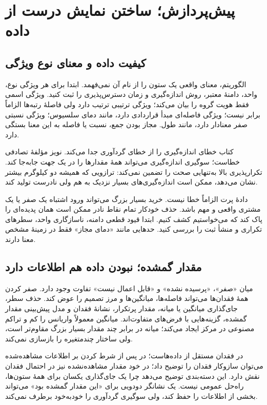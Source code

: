 \chapter{پیش‌پردازش؛ ساختن نمایش درست از داده}

\section{کیفیت داده و معنای نوع ویژگی}
الگوریتم، معنای واقعی یک ستون را از نام آن نمی‌فهمد. ابتدا برای هر ویژگی نوع، واحد، دامنهٔ معتبر، روش اندازه‌گیری و زمان دسترس‌پذیری را ثبت کنید. ویژگی اسمی  فقط هویت گروه را بیان می‌کند؛ ویژگی ترتیبی  ترتیب دارد ولی فاصلهٔ رتبه‌ها الزاماً برابر نیست؛ ویژگی فاصله‌ای مبدأ قراردادی دارد، مانند دمای سلسیوس؛ ویژگی نسبتی صفر معنادار دارد، مانند طول. مجاز بودن جمع، نسبت یا فاصله به این معنا بستگی دارد.

کتاب خطای اندازه‌گیری را از خطای گردآوری جدا می‌کند. نویز مؤلفهٔ تصادفی خطاست؛ سوگیری اندازه‌گیری می‌تواند همهٔ مقدارها را در یک جهت جابه‌جا کند. تکرارپذیری بالا به‌تنهایی صحت را تضمین نمی‌کند: ترازویی که همیشه دو کیلوگرم بیشتر نشان می‌دهد، ممکن است اندازه‌گیری‌های بسیار نزدیک به هم ولی نادرست تولید کند.

دادهٔ پرت  الزاماً خطا نیست. خرید بسیار بزرگ می‌تواند ورود اشتباه یک صفر یا یک مشتری واقعی و مهم باشد. حذف خودکار تمام نقاط نادر ممکن است همان پدیده‌ای را پاک کند که می‌خواستیم کشف کنیم. ابتدا قیود قطعی دامنه، ناسازگاری واحد، سطرهای تکراری و منشأ ثبت را بررسی کنید. حدهایی مانند «دمای مجاز» فقط در زمینهٔ مشخص معنا دارند.

\section{مقدار گمشده؛ نبودن داده هم اطلاعات دارد}
میان «صفر»، «پرسیده نشده» و «قابل اعمال نیست» تفاوت وجود دارد. صفر کردن همهٔ فقدان‌ها می‌تواند فاصله‌ها، میانگین‌ها و مرز تصمیم را عوض کند. حذف سطر، جای‌گذاری میانگین یا میانه، مقدار پرتکرار، نشانهٔ فقدان و مدل پیش‌بینی مقدار گمشده، گزینه‌هایی با فرض‌های متفاوت‌اند. میانگین معمولاً واریانس را کم و تراکم مصنوعی در مرکز ایجاد می‌کند؛ میانه در برابر چند مقدار بسیار بزرگ مقاوم‌تر است، ولی ساختار چندمتغیره را بازسازی نمی‌کند.

در  فقدان مستقل از داده‌هاست؛ در  پس از شرط کردن بر اطلاعات مشاهده‌شده می‌توان سازوکار فقدان را توضیح داد؛ در  خود مقدار مشاهده‌نشده نیز در احتمال فقدان نقش دارد. این دسته‌بندی توضیح می‌دهد چرا یک جای‌گذاری یکسان برای همهٔ ستون‌ها، راه‌حل عمومی نیست. یک نشانگر دودویی برای «این مقدار گمشده بود» می‌تواند بخشی از اطلاعات را حفظ کند، ولی سوگیری گردآوری را خودبه‌خود برطرف نمی‌کند.

